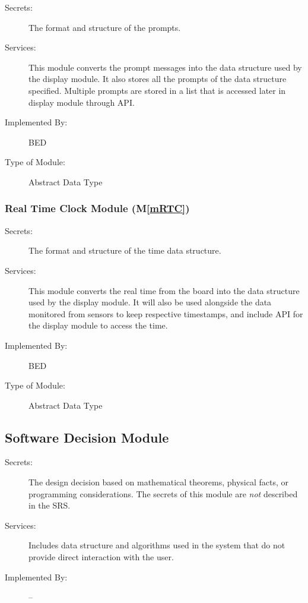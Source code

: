 \documentclass[12pt, titlepage]{article}
\newcommand{\mref}[1]{M\ref{#1}}
\begin{document}
\begin{description}
  \item[Secrets:]The format and structure of the prompts.
  \item[Services:] This module converts the prompt messages into the data structure used by the
    display module. It also stores all the prompts of the data structure specified. Multiple prompts are stored in a list that is accessed later in display module through API.
  \item[Implemented By:] BED
  \item[Type of Module:] Abstract Data Type
\end{description}

\subsubsection{Real Time Clock Module (\mref{mRTC})}

\begin{description}
  \item[Secrets:]The format and structure of the time data structure.
  \item[Services:] This module converts the real time from the board into the data structure used by the
    display module. It will also be used alongside the data monitored from sensors to keep respective timestamps, and include API for the display module to access the time.
  \item[Implemented By:] BED
  \item[Type of Module:] Abstract Data Type
\end{description}


\subsection{Software Decision Module}

\begin{description}
  \item[Secrets:] The design decision based on mathematical theorems, physical
    facts, or programming considerations. The secrets of this module are
    \emph{not} described in the SRS.
  \item[Services:] Includes data structure and algorithms used in the system that
    do not provide direct interaction with the user.
  \item[Implemented By:] --
\end{description}
\end{document}
